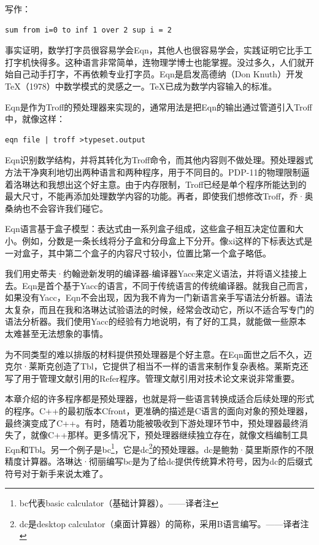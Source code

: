 \documentclass[a4paper,12pt,UTF8,twoside]{ctexbook}
\begin{document}
写作：

\begin{lstlisting}
sum from i=0 to inf 1 over 2 sup i = 2
\end{lstlisting}

事实证明，数学打字员很容易学会Eqn，其他人也很容易学会，实践证明它比手工打字机快得多。这种语言非常简单，连物理学博士也能掌握。没过多久，人们就开始自己动手打字，不再依赖专业打字员。Eqn是启发高德纳（Don Knuth）开发TeX（1978）中数学模式的灵感之一。TeX已成为数学内容输入的标准。

Eqn是作为Troff的预处理器来实现的，通常用法是把Eqn的输出通过管道引入Troff中，就像这样：

\begin{lstlisting}
eqn file | troff >typeset.output
\end{lstlisting}

Eqn识别数学结构，并将其转化为Troff命令，而其他内容则不做处理。预处理器式方法干净爽利地切出两种语言和两种程序，用于不同目的。PDP-11的物理限制逼着洛琳达和我想出这个好主意。由于内存限制，Troff已经是单个程序所能达到的最大尺寸，不能再添加处理数学内容的功能。再者，即使我们想修改Troff，乔·奥桑纳也不会容许我们碰它。

Eqn语言基于盒子模型：表达式由一系列盒子组成，这些盒子相互决定位置和大小。例如，分数是一条长线将分子盒和分母盒上下分开。像xi这样的下标表达式是一对盒子，其中第二个盒子的内容尺寸较小，位置比第一个盒子略低。

我们用史蒂夫·约翰逊新发明的编译器-编译器Yacc来定义语法，并将语义挂接上去。Eqn是首个基于Yacc的语言，不同于传统语言的传统编译器。就我自己而言，如果没有Yacc，Eqn不会出现，因为我不肯为一门新语言亲手写语法分析器。语法太复杂，而且在我和洛琳达试验语法的时候，经常会改动它，所以不适合写专门的语法分析器。我们使用Yacc的经验有力地说明，有了好的工具，就能做一些原本太难甚至无法想象的事情。

为不同类型的难以排版的材料提供预处理器是个好主意。在Eqn面世之后不久，迈克尔·莱斯克创造了Tbl，它提供了相当不一样的语言来制作复杂表格。莱斯克还写了用于管理文献引用的Refer程序。管理文献引用对技术论文来说非常重要。

本章介绍的许多程序都是预处理器，也就是将一些语言转换成适合后续处理的形式的程序。C++的最初版本Cfront，更准确的描述是C语言的面向对象的预处理器，最终演变成了C++。有时，随着功能被吸收到下游处理环节中，预处理器最终消失了，就像C++那样。更多情况下，预处理器继续独立存在，就像文档编制工具Eqn和Tbl。另一个例子是bc\footnote{bc代表basic calculator（基础计算器）。——译者注}，它是dc\footnote{dc是desktop calculator（桌面计算器）的简称，采用B语言编写。——译者注}的预处理器。dc是鲍勃·莫里斯原作的不限精度计算器。洛琳达·彻丽编写bc是为了给dc提供传统算术符号，因为dc的后缀式符号对于新手来说太难了。
\end{document}
